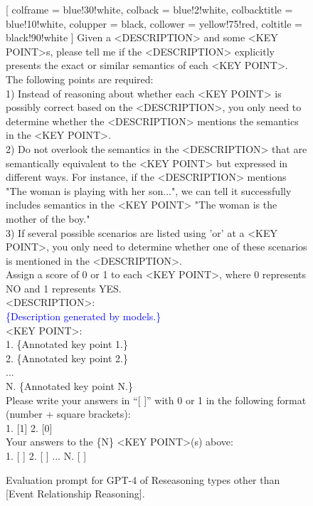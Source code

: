 \begin{figure}
  \begin{tcolorbox}
      [
      colframe = blue!30!white, 
      colback = blue!2!white,
      colbacktitle = blue!10!white,
      colupper = black, collower = yellow!75!red,
      coltitle = black!90!white
      ]
      \noindent
      \small
      Given a <DESCRIPTION> and some <KEY POINT>s, please tell me if the <DESCRIPTION> explicitly presents the exact or similar semantics of each <KEY POINT>. The following points are required: \\

      1) Instead of reasoning about whether each <KEY POINT> is possibly correct based on the <DESCRIPTION>, you only need to determine whether the <DESCRIPTION> mentions the semantics in the <KEY POINT>. \\
      2) Do not overlook the semantics in the <DESCRIPTION> that are semantically equivalent to the <KEY POINT> but expressed in different ways. For instance, if the <DESCRIPTION> mentions "The woman is playing with her son...", we can tell it successfully includes semantics in the <KEY POINT> "The woman is the mother of the boy." \\
      3) If several possible scenarios are listed using 'or' at a <KEY POINT>, you only need to determine whether one of these scenarios is mentioned in the <DESCRIPTION>. \\

      Assign a score of 0 or 1 to each <KEY POINT>, where 0 represents NO and 1 represents YES. \\

      {<DESCRIPTION>:} \\
      \textcolor{blue}{\{Description generated by models.\}} \\

      {<KEY POINT>:} \\
      \textcolor{c2}{1. \{Annotated key point 1.\}} \\
      \textcolor{c2}{2. \{Annotated key point 2.\}} \\
      \textcolor{c2}{...} \\
      \textcolor{c2}{N. \{Annotated key point N.\}} \\
      

      Please write your answers in ``[ ]'' with 0 or 1 in the following format (number + square brackets): \\
      
      1. [1]  2. [0] \\
      
      Your answers to the \textcolor{c2}{\{N\}} <KEY POINT>(s) above: \\
      \textcolor{c2}{1. [ ]  2. [ ] ... N. [ ]}  \\
  \end{tcolorbox}
  \caption{Evaluation prompt for GPT-4 of Reseasoning types other than [Event Relationship Reasoning].}
  \label{fig:eval}
\end{figure}

